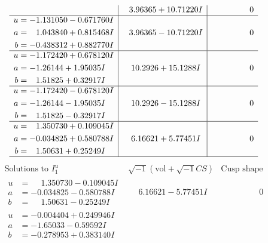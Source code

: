 \documentclass[1p]{elsarticle_modified}
\theoremstyle{definition}
\newcommand{\I}{\sqrt{-1}}
\begin{document}
$$\begin{array}{c|c|c}
 & \phantom{-}3.96365 + 10.71220 I & \phantom{-0.000000 } 0 \\ \hline\begin{aligned}
u &= -1.131050 - 0.671760 I \\
a &= \phantom{-}1.043840 + 0.815468 I \\
b &= -0.438312 + 0.882770 I\end{aligned}
 & \phantom{-}3.96365 - 10.71220 I & \phantom{-0.000000 } 0 \\ \hline\begin{aligned}
u &= -1.172420 + 0.678120 I \\
a &= -1.26144 + 1.95035 I \\
b &= \phantom{-}1.51825 + 0.32917 I\end{aligned}
 & \phantom{-}10.2926 + 15.1288 I & \phantom{-0.000000 } 0 \\ \hline\begin{aligned}
u &= -1.172420 - 0.678120 I \\
a &= -1.26144 - 1.95035 I \\
b &= \phantom{-}1.51825 - 0.32917 I\end{aligned}
 & \phantom{-}10.2926 - 15.1288 I & \phantom{-0.000000 } 0 \\ \hline\begin{aligned}
u &= \phantom{-}1.350730 + 0.109045 I \\
a &= -0.034825 + 0.580788 I \\
b &= \phantom{-}1.50631 + 0.25249 I\end{aligned}
 & \phantom{-}6.16621 + 5.77451 I & \phantom{-0.000000 } 0\\
 \hline 
 \end{array}$$\newpage$$\begin{array}{c|c|c}  
\text{Solutions to }I^u_{1}& \I (\text{vol} + \sqrt{-1}CS) & \text{Cusp shape}\\
 \hline 
\begin{aligned}
u &= \phantom{-}1.350730 - 0.109045 I \\
a &= -0.034825 - 0.580788 I \\
b &= \phantom{-}1.50631 - 0.25249 I\end{aligned}
 & \phantom{-}6.16621 - 5.77451 I & \phantom{-0.000000 } 0 \\ \hline\begin{aligned}
u &= -0.004404 + 0.249946 I \\
a &= -1.65033 - 0.59592 I \\
b &= -0.278953 + 0.383140 I\end{aligned}

\end{array}$$
\end{document}
